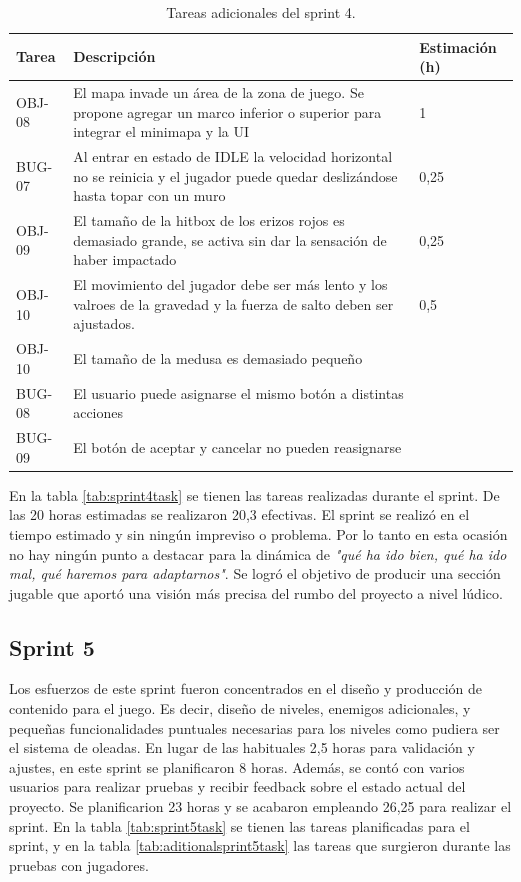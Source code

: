 \begin{table}[!ht]
    \centering
    \begin{tabular}{|l|p{8cm}|l|}
    \hline
        Tarea & Descripción & Estimación (h) \\ \hline
        OBJ-08 & El mapa invade un área de la zona de juego. Se propone agregar un marco inferior o superior para integrar el minimapa y la UI & 1 \\ \hline
        BUG-07 & Al entrar en estado de IDLE la velocidad horizontal no se reinicia y el jugador puede quedar deslizándose hasta topar con un muro & 0,25 \\ \hline
        OBJ-09 & El tamaño de la hitbox de los erizos rojos es demasiado grande, se activa sin dar la sensación de haber impactado & 0,25 \\ \hline
        OBJ-10 & El movimiento del jugador debe ser más lento y los valroes de la gravedad y la fuerza de salto deben ser ajustados. & 0,5 \\ \hline
        OBJ-10 & El tamaño de la medusa es demasiado pequeño & ~ \\ \hline
        BUG-08 & El usuario puede asignarse el mismo botón a distintas acciones & ~ \\ \hline
        BUG-09 & El botón de aceptar y cancelar no pueden reasignarse & ~ \\ \hline
    \end{tabular}
    \caption{Tareas adicionales del sprint 4.}
    \label{tab:aditionalsprint4task}
\end{table}

En la tabla \ref{tab:sprint4task} se tienen las tareas realizadas durante el sprint. De las 20 horas estimadas se realizaron 20,3 efectivas. El sprint se realizó en el tiempo estimado y sin ningún impreviso o problema. Por lo tanto en esta ocasión no hay ningún punto a destacar para la dinámica de \textit{"qué ha ido bien, qué ha ido mal, qué haremos para adaptarnos"}. Se logró el objetivo de producir una sección jugable que aportó una visión más precisa del rumbo del proyecto a nivel lúdico.

\subsection{Sprint 5}

Los esfuerzos de este sprint fueron concentrados en el diseño y producción de contenido para el juego. Es decir, diseño de niveles, enemigos adicionales, y pequeñas funcionalidades puntuales necesarias para los niveles como pudiera ser el sistema de oleadas. En lugar de las habituales 2,5 horas para validación y ajustes, en este sprint se planificaron 8 horas. Además, se contó con varios usuarios para realizar pruebas y recibir feedback sobre el estado actual del proyecto. Se planificarion 23 horas y se acabaron empleando 26,25 para realizar el sprint. En la tabla \ref{tab:sprint5task} se tienen las tareas planificadas para el sprint, y en la tabla \ref{tab:aditionalsprint5task} las tareas que surgieron durante las pruebas con jugadores.

